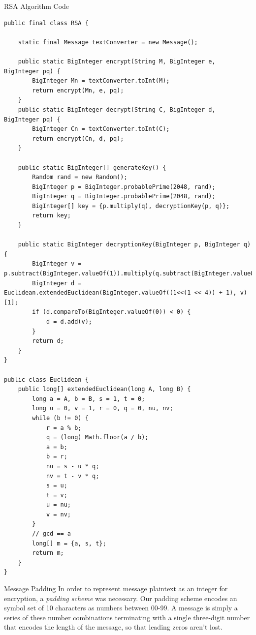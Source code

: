 \documentclass[landscape,a0paper,fontscale=.46]{baposter} %
\begin{document}
\begin{poster}
\begin{posterbox}[name=code,column=2,span=2,row=0]{RSA Algorithm Code}
\begin{verbatim}
public final class RSA {

    static final Message textConverter = new Message();

    public static BigInteger encrypt(String M, BigInteger e, BigInteger pq) {
        BigInteger Mn = textConverter.toInt(M);
        return encrypt(Mn, e, pq);
    }
    public static BigInteger decrypt(String C, BigInteger d, BigInteger pq) {
        BigInteger Cn = textConverter.toInt(C);
        return encrypt(Cn, d, pq);
    }

    public static BigInteger[] generateKey() {
        Random rand = new Random();
        BigInteger p = BigInteger.probablePrime(2048, rand);
        BigInteger q = BigInteger.probablePrime(2048, rand);
        BigInteger[] key = {p.multiply(q), decryptionKey(p, q)};
        return key;
    }

    public static BigInteger decryptionKey(BigInteger p, BigInteger q) {
        BigInteger v = p.subtract(BigInteger.valueOf(1)).multiply(q.subtract(BigInteger.valueOf(1)));
        BigInteger d = Euclidean.extendedEuclidean(BigInteger.valueOf((1<<(1 << 4)) + 1), v)[1];
        if (d.compareTo(BigInteger.valueOf(0)) < 0) {
            d = d.add(v);
        }
        return d;
    }
}

public class Euclidean {
    public long[] extendedEuclidean(long A, long B) {
        long a = A, b = B, s = 1, t = 0;
        long u = 0, v = 1, r = 0, q = 0, nu, nv;
        while (b != 0) {
            r = a % b;
            q = (long) Math.floor(a / b);
            a = b;
            b = r;
            nu = s - u * q;
            nv = t - v * q;
            s = u;
            t = v;
            u = nu;
            v = nv;
        }
        // gcd == a
        long[] m = {a, s, t};
        return m;
    }
}
\end{verbatim}

\end{posterbox}





\begin{posterbox}[name=padding, column=0, below=intro]{Message Padding}
In order to represent message plaintext as an integer for encryption, a \emph{padding scheme} was necessary. Our padding scheme encodes an symbol set of 10 characters as numbers between 00-99. A message is simply a series of these number combinations terminating with a single three-digit number that encodes the length of the message, so that leading zeros aren't lost.
\end{posterbox}



\end{poster}
\end{document}
